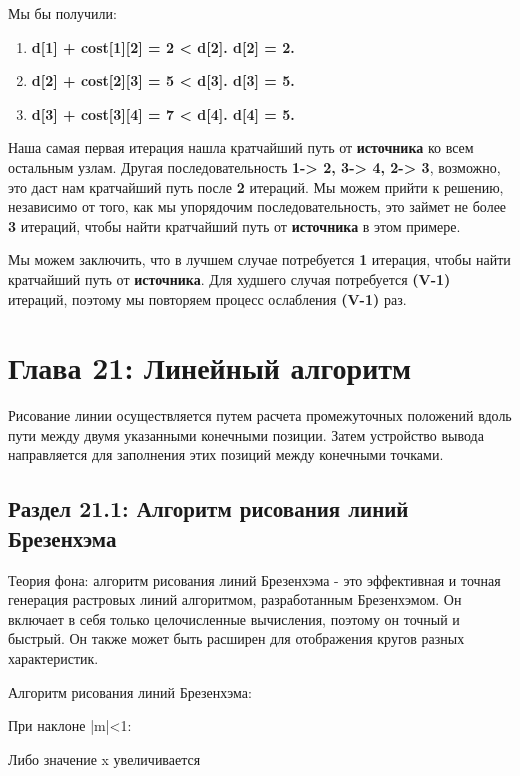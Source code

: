 Мы бы получили:

\begin{enumerate}
\item \textbf{d[1] + cost[1][2] = 2 < d[2]. d[2] = 2.}
\item \textbf{d[2] + cost[2][3] = 5 < d[3]. d[3] = 5.}
\item \textbf{d[3] + cost[3][4] = 7 < d[4]. d[4] = 5.}
\end{enumerate}

Наша самая первая итерация нашла кратчайший путь от \textbf{источника} ко всем остальным
узлам. Другая последовательность \textbf{1-> 2, 3-> 4, 2-> 3}, возможно, это даст нам кратчайший
путь после \textbf{2} итераций. Мы можем прийти к решению, независимо от того, как мы
упорядочим последовательность, это займет не более \textbf{3} итераций, чтобы найти кратчайший
путь от \textbf{источника} в этом примере.

\hspace{\baselineskip}

Мы можем заключить, что в лучшем случае потребуется \textbf{1} итерация, чтобы найти
кратчайший путь от \textbf{источника}. Для худшего случая потребуется \textbf{(V-1)} итераций, поэтому мы
повторяем процесс ослабления \textbf{(V-1)} раз.

\chapter*{Глава 21: Линейный алгоритм}
\vspace{-1cm}
Рисование линии осуществляется путем расчета промежуточных положений вдоль пути
между двумя указанными конечными позиции. Затем устройство вывода направляется для
заполнения этих позиций между конечными точками.

\section*{Раздел 21.1: Алгоритм рисования линий Брезенхэма}

Теория фона: алгоритм рисования линий Брезенхэма - это эффективная и точная генерация
растровых линий алгоритмом, разработанным Брезенхэмом. Он включает в себя только
целочисленные вычисления, поэтому он точный и быстрый. Он также может быть расширен
для отображения кругов разных характеристик.

Алгоритм рисования линий Брезенхэма:

При наклоне |m|<1:

Либо значение x увеличивается

